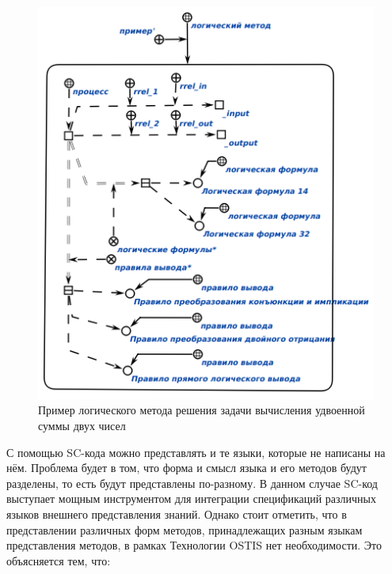 \begin{figure}[htbp]
  \center
  \includegraphics[width=1\linewidth]{figures/logic_program.png}
  \caption{Пример логического метода решения задачи вычисления удвоенной суммы двух чисел}
  \label{fig:logic_program}
\end{figure}

С помощью SC-кода можно представлять и те языки, которые не написаны на нём. Проблема будет в том, что форма и смысл языка и его методов будут разделены, то есть будут представлены по-разному. В данном случае SC-код выступает мощным инструментом для интеграции спецификаций различных языков внешнего представления знаний. Однако стоит отметить, что в представлении различных форм методов, принадлежащих разным языкам представления методов, в рамках Технологии OSTIS нет необходимости. Это объясняется тем, что:

